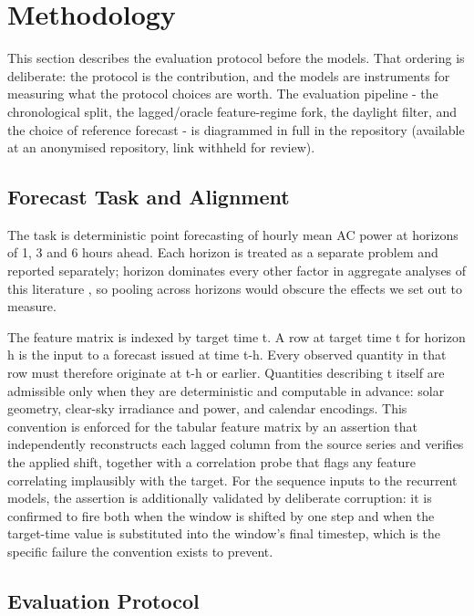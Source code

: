 \section{Methodology}
\label{sec:methodology}

This section describes the evaluation protocol before the models. That
ordering is deliberate: the protocol is the contribution, and the models
are instruments for measuring what the protocol choices are worth. The
evaluation pipeline - the chronological split, the lagged/oracle
feature-regime fork, the daylight filter, and the choice of reference
forecast - is diagrammed in full in the repository (available at an
anonymised repository, link withheld for review).

\subsection{Forecast Task and Alignment}
\label{sec:methodology-task-alignment}

The task is deterministic point forecasting of hourly mean AC power at
horizons of 1, 3 and 6 hours ahead. Each horizon is treated as a
separate problem and reported separately; horizon dominates every other
factor in aggregate analyses of this literature \cite{nguyenmusgens2022meta}, so pooling across horizons would obscure the effects we set out to
measure.

The feature matrix is indexed by target time t. A row at target time t
for horizon h is the input to a forecast issued at time t-h. Every
observed quantity in that row must therefore originate at t-h or
earlier. Quantities describing t itself are admissible only when they
are deterministic and computable in advance: solar geometry, clear-sky
irradiance and power, and calendar encodings. This convention is
enforced for the tabular feature matrix by an assertion that
independently reconstructs each lagged column from the source series and
verifies the applied shift, together with a correlation probe that
flags any feature correlating implausibly with the target. For the
sequence inputs to the recurrent models, the assertion is additionally
validated by deliberate corruption: it is confirmed to fire both when
the window is shifted by one step and when the target-time value is
substituted into the window's final timestep, which is the specific
failure the convention exists to prevent.

\subsection{Evaluation Protocol}
\label{sec:eval-protocol}

